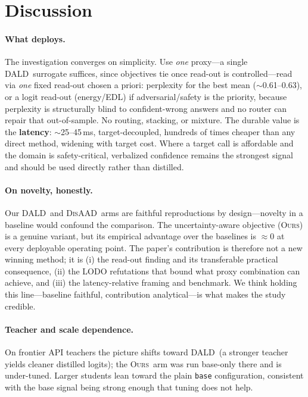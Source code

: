 \documentclass[11pt]{article}
\newcommand{\ours}{\textsc{Ours}}
\newcommand{\dald}{\textsc{DALD}}
\newcommand{\disaad}{\textsc{DisAAD}}
\begin{document}
\section{Discussion}\label{sec:discussion}
\paragraph{What deploys.} The investigation converges on simplicity. Use \emph{one}
proxy---a single \dald\ surrogate suffices, since objectives tie once read-out is
controlled---read via \emph{one} fixed read-out chosen a priori: perplexity for the best
mean ($\sim$0.61--0.63), or a logit read-out (energy/EDL) if adversarial/safety is the
priority, because perplexity is structurally blind to confident-wrong answers and no
router can repair that out-of-sample. No routing, stacking, or mixture. The durable
value is the \textbf{latency}: $\sim$25--45\,ms, target-decoupled, hundreds of times
cheaper than any direct method, widening with target cost. Where a target call is
affordable and the domain is safety-critical, verbalized confidence remains the strongest
signal and should be used directly rather than distilled.

\paragraph{On novelty, honestly.} Our \dald\ and \disaad\ arms are faithful
reproductions by design---novelty in a baseline would confound the comparison. The
uncertainty-aware objective (\ours) is a genuine variant, but its empirical advantage
over the baselines is $\approx 0$ at every deployable operating point. The paper's
contribution is therefore not a new winning method; it is (i) the read-out finding and
its transferable practical consequence, (ii) the LODO refutations that bound what proxy
combination can achieve, and (iii) the latency-relative framing and benchmark. We think
holding this line---baseline faithful, contribution analytical---is what makes the study
credible.

\paragraph{Teacher and scale dependence.} On frontier API teachers the picture shifts
toward \dald\ (a stronger teacher yields cleaner distilled logits); the \ours\ arm was
run base-only there and is under-tuned. Larger students lean toward the plain
\texttt{base} configuration, consistent with the base signal being strong enough that
tuning does not help.
\end{document}
